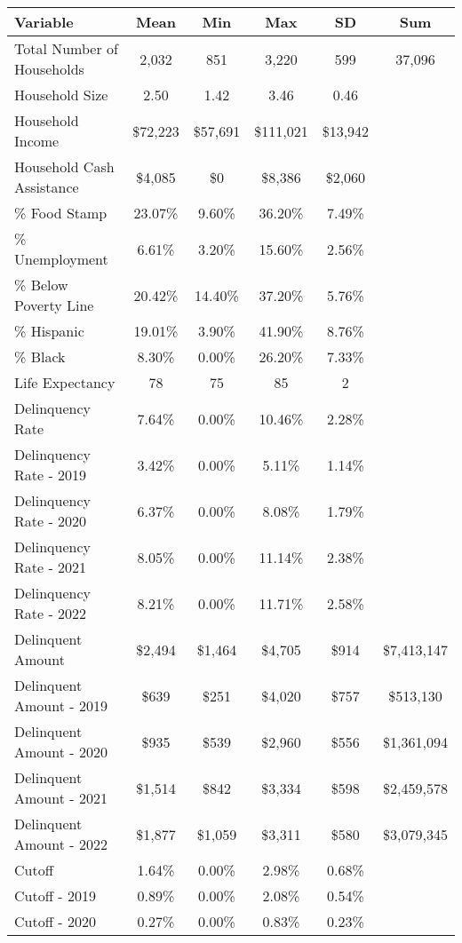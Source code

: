 \begin{tabular}{l|c|c|c|c|c}
\toprule 
\midrule 
Variable & Mean & Min & Max & SD & Sum \\
\midrule 
Total Number of Households & 2,032 & 851 & 3,220 & 599 & 37,096 \\
\quad Household Size & 2.50 & 1.42 & 3.46 & 0.46 \\
Household Income & \$72,223 & \$57,691 & \$111,021 & \$13,942 \\
\quad Household Cash Assistance & \$4,085 & \$0 & \$8,386 & \$2,060 \\
\% Food Stamp & 23.07\% & 9.60\% & 36.20\% & 7.49\% \\
\% Unemployment & 6.61\% & 3.20\% & 15.60\% & 2.56\% \\
\% Below Poverty Line & 20.42\% & 14.40\% & 37.20\% & 5.76\% \\
\% Hispanic & 19.01\% & 3.90\% & 41.90\% & 8.76\% \\
\% Black & 8.30\% & 0.00\% & 26.20\% & 7.33\% \\
Life Expectancy & 78 & 75 & 85 & 2 \\
\midrule 
Delinquency Rate & 7.64\% & 0.00\% & 10.46\% & 2.28\% \\
\quad Delinquency Rate - 2019 & 3.42\% & 0.00\% & 5.11\% & 1.14\% \\
\quad Delinquency Rate - 2020 & 6.37\% & 0.00\% & 8.08\% & 1.79\% \\
\quad Delinquency Rate - 2021 & 8.05\% & 0.00\% & 11.14\% & 2.38\% \\
\quad Delinquency Rate - 2022 & 8.21\% & 0.00\% & 11.71\% & 2.58\% \\
\midrule 
Delinquent Amount & \$2,494 & \$1,464 & \$4,705 & \$914 & \$7,413,147 \\
\quad Delinquent Amount - 2019 & \$639 & \$251 & \$4,020 & \$757 & \$513,130 \\
\quad Delinquent Amount - 2020 & \$935 & \$539 & \$2,960 & \$556 & \$1,361,094 \\
\quad Delinquent Amount - 2021 & \$1,514 & \$842 & \$3,334 & \$598 & \$2,459,578 \\
\quad Delinquent Amount - 2022 & \$1,877 & \$1,059 & \$3,311 & \$580 & \$3,079,345 \\
\midrule 
Cutoff & 1.64\% & 0.00\% & 2.98\% & 0.68\% \\
\quad Cutoff - 2019 & 0.89\% & 0.00\% & 2.08\% & 0.54\% \\
\quad Cutoff - 2020 & 0.27\% & 0.00\% & 0.83\% & 0.23\% \\

\end{tabular}
